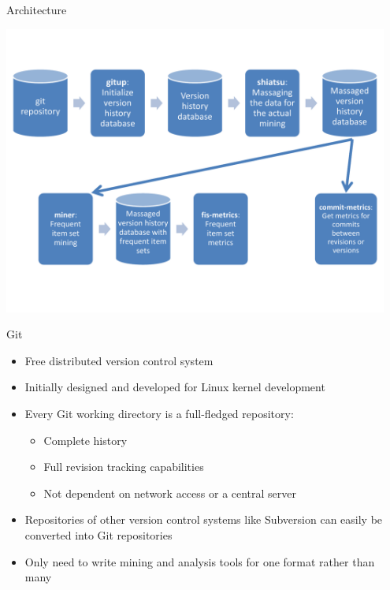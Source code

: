 \begin{frame}{Architecture}
  \begin{center}
    \includegraphics[width=0.95\textwidth]{figures/miner-architecture}
  \end{center}
\end{frame}

\note{
}

\begin{frame}{Git}
  \begin{itemize}
  \item Free distributed version control system
  \item Initially designed and developed for Linux kernel development
  \item Every Git working directory is a full-fledged repository:
    \begin{itemize}
    \item Complete history
    \item Full revision tracking capabilities
    \item Not dependent on network access or a central server
    \end{itemize}
  \item Repositories of other version control systems like Subversion
    can easily be converted into Git repositories
  \item Only need to write mining and analysis tools for one format
    rather than many
  \end{itemize}
\end{frame}


